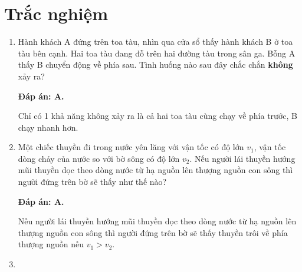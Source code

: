 \whiteBGstarBegin
\setcounter{section}{0}
\section{Trắc nghiệm}
\begin{enumerate}[label=\bfseries Câu \arabic*:]
	
		\item {}
	
	\cauhoi
	{Hành khách A đứng trên toa tàu, nhìn qua cửa sổ thấy hành khách B ở toa tàu bên cạnh. Hai toa tàu đang đỗ trên hai đường tàu trong sân ga. Bỗng A thấy B chuyển động về phía sau. Tình huống nào sau đây chắc chắn \textbf{không} xảy ra?
		
	}
	\loigiai
	{	\textbf{Đáp án: A.}
		
	Chỉ có 1 khả năng không xảy ra là cả hai toa tàu cùng chạy về phía trước, B chạy nhanh hơn.
	}

	\item {}
	
	\cauhoi
	{Một chiếc thuyền đi trong nước yên lăng với vận tốc có độ lớn $v_1$, vận tốc dòng chảy của nước so với bờ sông có độ lớn $v_2$. Nếu người lái thuyền hướng mũi thuyền dọc theo dòng nước từ hạ nguồn lên thượng nguồn con sông thì người đứng trên bờ sẽ thấy như thế nào?
		
	}
	\loigiai
	{	\textbf{Đáp án: A.}
	
	Nếu người lái thuyền hướng mũi thuyền dọc theo dòng nước từ hạ nguồn lên thượng nguồn con sông thì người đứng trên bờ sẽ thấy thuyền trôi về phía thượng nguồn nếu $v_1>v_2$.
	}
	\item {}
	

\end{enumerate}
